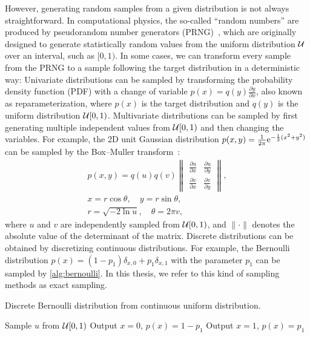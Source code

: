 However, generating random samples from a given distribution is not always straightforward. In computational physics, the so-called ``random numbers'' are produced by pseudorandom number generators (PRNG)~\cite{press2007numerical}, which are originally designed to generate statistically random values from the uniform distribution $\mathcal{U}$ over an interval, such as $[0, 1)$. In some cases, we can transform every sample from the PRNG to a sample following the target distribution in a deterministic way: Univariate distributions can be sampled by transforming the probability density function (PDF) with a change of variable $p(x) = q(y) \frac{\partial y}{\partial x}$, also known as reparameterization, where $p(x)$ is the target distribution and $q(y)$ is the uniform distribution $\mathcal{U}[0, 1)$. Multivariate distributions can be sampled by first generating multiple independent values from $\mathcal{U}[0, 1)$ and then changing the variables. For example, the 2D unit Gaussian distribution
$p(x, y) = \frac{1}{2 \pi} \mathrm{e}^{-\frac{1}{2} (x^2 + y^2)}$ can be sampled by the Box--Muller transform~\cite{box1958note}:
\begin{gather}
p(x, y) = q(u) q(v) \begin{Vmatrix}
\frac{\partial u}{\partial x} & \frac{\partial u}{\partial y} \\
\frac{\partial v}{\partial x} & \frac{\partial v}{\partial y}
\end{Vmatrix}, \label{eq:reparam} \\
x = r \cos \theta, \quad y = r \sin \theta, \\
r = \sqrt{-2 \ln u}, \quad \theta = 2 \pi v,
\end{gather}
where $u$ and $v$ are independently sampled from $\mathcal{U}[0, 1)$, and $\lVert \cdot \rVert$ denotes the absolute value of the determinant of the matrix. Discrete distributions can be obtained by discretizing continuous distributions. For example, the Bernoulli distribution $p(x) = (1 - p_1) \delta_{x, 0} + p_1 \delta_{x, 1}$ with the parameter $p_1$ can be sampled by \cref{alg:bernoulli}. In this thesis, we refer to this kind of sampling methods as exact sampling.

\begin{algorithm}[H]
\caption[Discrete Bernoulli distribution from continuous uniform distribution]{
Discrete Bernoulli distribution from continuous uniform distribution.
}
\label{alg:bernoulli}
\begin{algorithmic}[1]
\STATE Sample $u$ from $\mathcal{U}[0, 1)$
    \STATE Output $x = 0$, $p(x) = 1 - p_1$
\ELSE
    \STATE Output $x = 1$, $p(x) = p_1$
\ENDIF
\end{algorithmic}
\end{algorithm}


